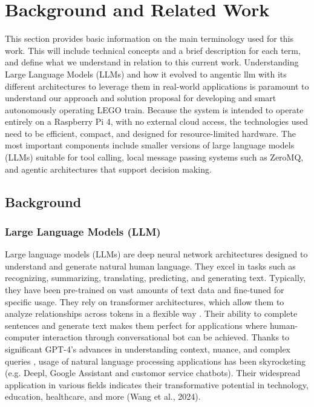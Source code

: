 \chapter{Background and Related Work}
\label{ch:background}

This section provides basic information on the main terminology used for this work. This will include technical concepts and a brief description for each term, and define what we understand in relation to this current work. Understanding Large Language Models (LLMs) and how it evolved to angentic llm with its different architectures to leverage them in real-world applications is paramount to understand our approach and solution proposal for developing and smart autonomously operating LEGO train.
Because the system is intended to operate entirely on a Raspberry Pi 4, with no external cloud access, the technologies used need to be efficient, compact, and designed for resource-limited hardware. The most important components include smaller versions of large language models (LLMs) suitable for tool calling, local message passing systems such as ZeroMQ, and agentic architectures that support decision making.

%
%

\section{Background} %
\label{sec:background:first_section}

\subsection{Large Language Models (LLM)}
\label{subsec:background:first_section:first_subsection}

Large language models (LLMs) are deep neural network architectures designed to understand and generate natural human language. They excel in tasks such as recognizing, summarizing, translating, predicting, and generating text. Typically, they have been pre-trained on vast amounts of text data and fine-tuned for specific usage. They rely on transformer architectures, which allow them to analyze relationships across tokens in a flexible way \cite{vaswani_attention_2023, brown_efficient_2023}. Their ability to complete sentences and generate text makes them perfect for applications where human-computer interaction through conversational bot can be achieved. Thanks to significant GPT-4's advances in understanding context, nuance, and complex queries \cite{mapletoft_attempt_2024, cao_automatic_2024}, usage of natural language processing applications has been skyrocketing (e.g. Deepl, Google Assistant and customor service chatbots). Their widespread application in various fields indicates their transformative potential in technology, education, healthcare, and more (Wang et al., 2024).

